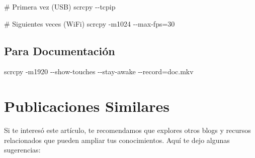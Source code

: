 \documentclass[
  doc,
  floatsintext,
  longtable,
  a4paper,
  nolmodern,
  notxfonts,
  notimes,
  12pt,
  colorlinks=true,linkcolor=blue,citecolor=blue,urlcolor=blue]{apa7}
\newenvironment{Shaded}{\begin{snugshade}}{\end{snugshade}}
\newcommand{\AttributeTok}[1]{\textcolor[rgb]{0.40,0.45,0.13}{#1}}
\newcommand{\CommentTok}[1]{\textcolor[rgb]{0.37,0.37,0.37}{#1}}
\newcommand{\ExtensionTok}[1]{\textcolor[rgb]{0.00,0.23,0.31}{#1}}
\newcommand{\NormalTok}[1]{\textcolor[rgb]{0.00,0.23,0.31}{#1}}
\newcommand{\OperatorTok}[1]{\textcolor[rgb]{0.37,0.37,0.37}{#1}}
\begin{document}
\begin{Shaded}
\begin{Highlighting}[]
\CommentTok{\# Primera vez (USB)}
\ExtensionTok{scrcpy} \AttributeTok{{-}{-}tcpip}

\CommentTok{\# Siguientes veces (WiFi)}
\ExtensionTok{scrcpy} \AttributeTok{{-}m1024} \AttributeTok{{-}{-}max{-}fps}\OperatorTok{=}\NormalTok{30}
\end{Highlighting}
\end{Shaded}

\subsection{Para Documentación}\label{para-documentaciuxf3n}

\begin{Shaded}
\begin{Highlighting}[]
\ExtensionTok{scrcpy} \AttributeTok{{-}m1920} \AttributeTok{{-}{-}show{-}touches} \AttributeTok{{-}{-}stay{-}awake} \AttributeTok{{-}{-}record}\OperatorTok{=}\NormalTok{doc.mkv}
\end{Highlighting}
\end{Shaded}

\section{Publicaciones Similares}\label{publicaciones-similares}

Si te interesó este artículo, te recomendamos que explores otros blogs y
recursos relacionados que pueden ampliar tus conocimientos. Aquí te dejo
algunas sugerencias:
\end{document}
